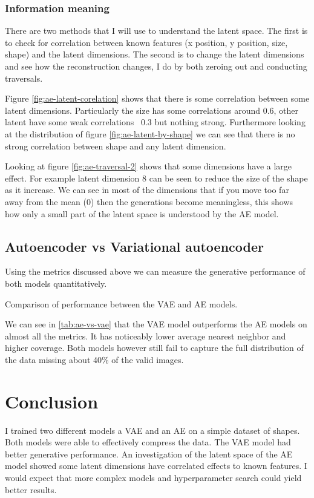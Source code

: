 \documentclass[conference,a4paper]{IEEEtran}
\newcommand{\centertable}[2]{
    \begin{table}[htbp]
        \centering
        \caption{#2}
        
        \label{tab:#1}
    \end{table}
}
\begin{document}
\subsubsection{Information meaning}

There are two methods that I will use to understand the latent space. The first is to check for correlation between known features (x position, y position, size, shape) and the latent dimensions. The second is to change the latent dimensions and see how the reconstruction changes, I do by both zeroing out and conducting traversals.

Figure \ref{fig:ae-latent-corelation} shows that there is some correlation between some latent dimensions. Particularly the size has some correlations around 0.6, other latent have some weak correlations ~0.3 but nothing strong. Furthermore looking at the distribution of figure \ref{fig:ae-latent-by-shape} we can see that there is no strong correlation between shape and any latent dimension.

Looking at figure \ref{fig:ae-traversal-2} shows that some dimensions have a large effect. For example latent dimension 8 can be seen to reduce the size of the shape as it increase. We can see in most of the dimensions that if you move too far away from the mean (0) then the generations become meaningless, this shows how only a small part of the latent space is understood by the AE model.

\subsection{Autoencoder vs Variational autoencoder}

Using the metrics discussed above we can measure the generative performance of both models quantitatively.

\centertable{ae-vs-vae}{Comparison of performance between the VAE and AE models.}

We can see in \ref{tab:ae-vs-vae} that the VAE model outperforms the AE models on almost all the metrics. It has noticeably lower average nearest neighbor and higher coverage. Both models however still fail to capture the full distribution of the data missing about 40\% of the valid images.


\section{Conclusion}

I trained two different models a VAE and an AE on a simple dataset of shapes. Both models were able to effectively compress the data. The VAE model had better generative performance. An investigation of the latent space of the AE model showed some latent dimensions have correlated effects to known features. I would expect that more complex models and hyperparameter search could yield better results.
\end{document}
